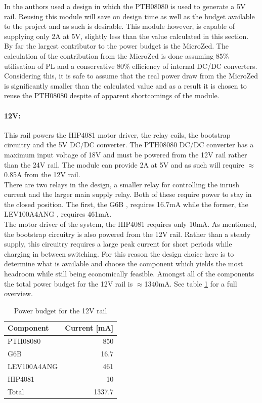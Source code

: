 In \cite{isaswarm} the authors used a design in which the PTH08080 is used to generate a 5V rail.
Reusing this module will save on design time as well as the budget available to the project and as such is desirable.
This module however, is capable of supplying only 2A at 5V, slightly less than the value calculated in this section.
By far the largest contributor to the power budget is the MicroZed.
The calculation of the contribution from the MicroZed is done assuming 85\% utilisation of PL and a conservative 80\% efficiency of internal DC/DC converters.
Considering this, it is safe to assume that the real power draw from the MicroZed is significantly smaller than the calculated value and as a result it is chosen to reuse the PTH08080 despite of apparent shortcomings of the module.

\paragraph{12V:} %
\label{par:12v}
This rail powers the HIP4081 motor driver, the relay coils, the bootstrap circuitry and the 5V DC/DC converter.
The PTH08080 DC/DC converter has a maximum input voltage of 18V and must be powered from the 12V rail rather than the 24V rail.
The module can provide 2A at 5V and as such will require $\approx$0.85A from the 12V rail.\\
There are two relays in the design, a smaller relay for controlling the inrush current and the larger main supply relay.
Both of these require power to stay in the closed position.
The first, the G6B \cite{g6b}, requires 16.7mA while the former, the LEV100A4ANG \cite{lev100}, requires 461mA.\\
The motor driver of the system, the HIP4081 requires only 10mA.
As mentioned, the bootstrap circuitry is also powered from the 12V rail.
Rather than a steady supply, this circuitry requires a large peak current for short periods while charging in between switching.
For this reason the design choice here is to determine what is available and choose the component which yields the most headroom while still being economically feasible.
Amongst all of the components the total power budget for the 12V rail is $\approx$1340mA.
See table \ref{tab:12vpowerbudget} for a full overview.

\begin{table}
	\centering
	\begin{tabular}{l|r}
		 Component & Current [mA]\\
		 \hline
		 PTH08080 & 850\\
		 G6B & 16.7\\
		 LEV100A4ANG & 461\\
		 HIP4081 & 10\\
		 \hline
		 Total & 1337.7
	\end{tabular}
	\caption{Power budget for the 12V rail}
	\label{tab:12vpowerbudget}
\end{table}

